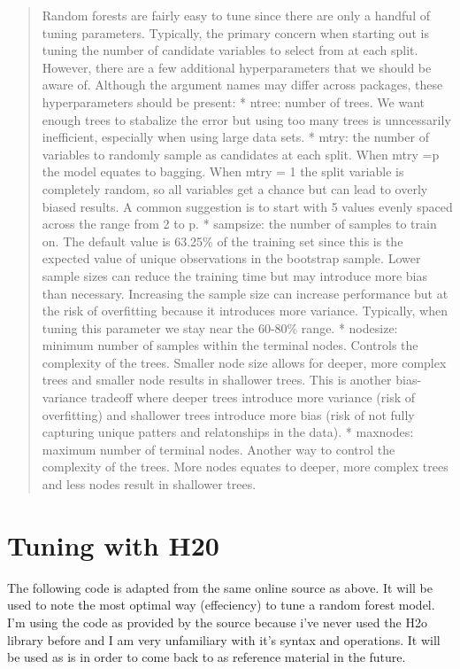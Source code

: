 \documentclass[]{article}
\begin{document}
\begin{quote}
Random forests are fairly easy to tune since there are only a handful of
tuning parameters. Typically, the primary concern when starting out is
tuning the number of candidate variables to select from at each split.
However, there are a few additional hyperparameters that we should be
aware of. Although the argument names may differ across packages, these
hyperparameters should be present: * ntree: number of trees. We want
enough trees to stabalize the error but using too many trees is
unncessarily inefficient, especially when using large data sets. * mtry:
the number of variables to randomly sample as candidates at each split.
When mtry =p the model equates to bagging. When mtry = 1 the split
variable is completely random, so all variables get a chance but can
lead to overly biased results. A common suggestion is to start with 5
values evenly spaced across the range from 2 to p. * sampsize: the
number of samples to train on. The default value is 63.25\% of the
training set since this is the expected value of unique observations in
the bootstrap sample. Lower sample sizes can reduce the training time
but may introduce more bias than necessary. Increasing the sample size
can increase performance but at the risk of overfitting because it
introduces more variance. Typically, when tuning this parameter we stay
near the 60-80\% range. * nodesize: minimum number of samples within the
terminal nodes. Controls the complexity of the trees. Smaller node size
allows for deeper, more complex trees and smaller node results in
shallower trees. This is another bias-variance tradeoff where deeper
trees introduce more variance (risk of overfitting) and shallower trees
introduce more bias (risk of not fully capturing unique patters and
relatonships in the data). * maxnodes: maximum number of terminal nodes.
Another way to control the complexity of the trees. More nodes equates
to deeper, more complex trees and less nodes result in shallower trees.
\end{quote}

\section{Tuning with H20}\label{tuning-with-h20}

The following code is adapted from the same online source as above. It
will be used to note the most optimal way (effeciency) to tune a random
forest model. I'm using the code as provided by the source because i've
never used the H2o library before and I am very unfamiliary with it's
syntax and operations. It will be used as is in order to come back to as
reference material in the future.
\end{document}
